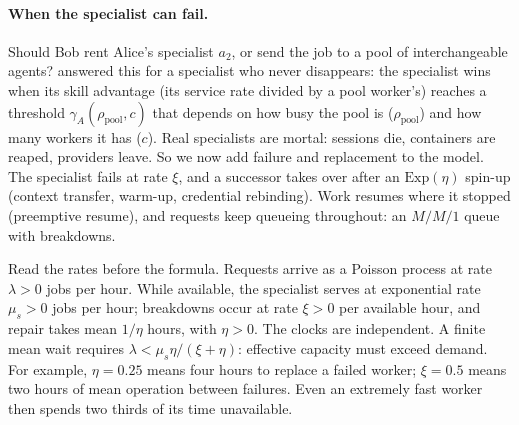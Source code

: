 \documentclass[11pt,a4paper]{article}
\theoremstyle{definition}
\theoremstyle{definition}
\theoremstyle{remark}
\begin{document}
\ifdefined\pdswisslandmarkplate
\begin{figure}[p]
  \centering
\end{figure}
\pdmarginpagebreak
\fi

\paragraph{When the specialist can fail.} Should Bob rent Alice's specialist
$a_2$, or send the job to a pool of interchangeable agents?
 answered this for a specialist who never
disappears: the specialist wins when its skill advantage (its service rate
divided by a pool worker's) reaches a threshold $\gamma_A(\rho_{\mathrm{pool}},c)$ that depends on
how busy the pool is ($\rho_{\mathrm{pool}}$) and how many workers it has ($c$). Real
specialists are mortal: sessions die, containers are reaped, providers
leave. So we now add failure and replacement to the model. The specialist
fails at rate $\xi$, and a successor takes over after an $\mathrm{Exp}(\eta)$
spin-up (context transfer, warm-up, credential rebinding). Work resumes where
it stopped (preemptive resume), and requests keep queueing throughout: an
$M/M/1$ queue with breakdowns.

Read the rates before the formula. Requests arrive as a Poisson process at
rate $\lambda>0$ jobs per hour. While available, the specialist serves at
exponential rate $\mu_s>0$ jobs per hour; breakdowns occur at rate $\xi>0$
per available hour, and repair takes mean $1/\eta$ hours, with $\eta>0$.
The clocks are independent. A finite mean wait
requires $\lambda<\mu_s\eta/(\xi+\eta)$: effective capacity must exceed demand.
For example, $\eta=0.25$ means four hours to replace a failed worker;
$\xi=0.5$ means two hours of mean operation between failures. Even an
extremely fast worker then spends two thirds of its time unavailable.
\end{document}
